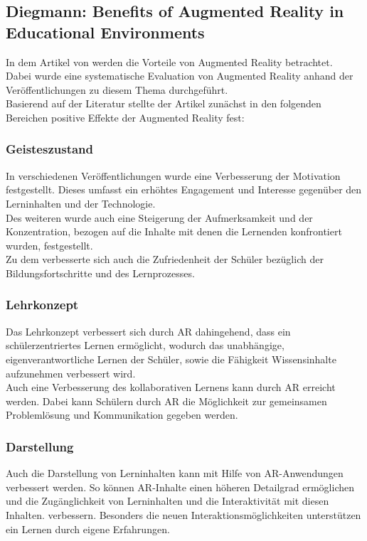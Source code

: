 \subsection{Diegmann: Benefits of Augmented Reality in Educational Environments}\label{sec:diegmann-benefits-ar}
In dem Artikel \citep{diegmann:benefits-ar} von \citeauthor{diegmann:benefits-ar} werden die Vorteile von Augmented Reality betrachtet. \\
Dabei wurde eine systematische Evaluation von Augmented Reality anhand der Veröffentlichungen zu diesem Thema durchgeführt. \\
Basierend auf der Literatur stellte der Artikel zunächst in den folgenden Bereichen positive Effekte der Augmented Reality fest:

\subsubsection{Geisteszustand}
In verschiedenen Veröffentlichungen wurde eine Verbesserung der Motivation festgestellt. Dieses umfasst ein erhöhtes Engagement und Interesse gegenüber den Lerninhalten und der Technologie.\\
Des weiteren wurde auch eine Steigerung der Aufmerksamkeit und der Konzentration, bezogen auf die Inhalte mit denen die Lernenden konfrontiert wurden, festgestellt.\\
Zu dem verbesserte sich auch die Zufriedenheit der Schüler bezüglich der Bildungsfortschritte und des Lernprozesses. 
\citep[Kapitel 4.1]{diegmann:benefits-ar}

\subsubsection{Lehrkonzept}
Das Lehrkonzept verbessert sich durch AR  dahingehend, dass ein schülerzentriertes Lernen ermöglicht, wodurch das unabhängige, eigenverantwortliche Lernen der Schüler, sowie die Fähigkeit Wissensinhalte aufzunehmen verbessert wird.\\
Auch eine Verbesserung des kollaborativen Lernens kann durch AR erreicht werden. Dabei kann Schülern durch AR die Möglichkeit zur gemeinsamen Problemlösung und Kommunikation gegeben werden.
\citep[Kapitel 4.2]{diegmann:benefits-ar}

\subsubsection{Darstellung}
Auch die Darstellung von Lerninhalten kann mit Hilfe von AR-Anwendungen verbessert werden. So können AR-Inhalte einen höheren Detailgrad ermöglichen und die Zugänglichkeit von Lerninhalten und die Interaktivität mit diesen Inhalten. verbessern. Besonders die neuen Interaktionsmöglichkeiten unterstützen ein Lernen durch eigene Erfahrungen.
\citep[Kapitel 4.3]{diegmann:benefits-ar}

